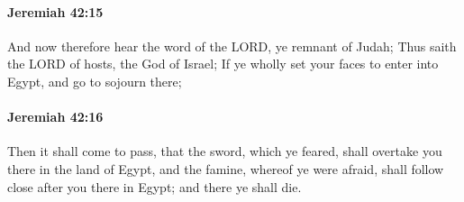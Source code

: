 		\paragraph{Jeremiah 42:15} %
			\label{JEREMIAH-42-15}

			And now therefore hear the word of the LORD, ye remnant of Judah; Thus saith the LORD of hosts, the God of Israel; If ye wholly set your faces to enter into Egypt, and go to sojourn there;


		\paragraph{Jeremiah 42:16} %
			\label{JEREMIAH-42-16}

			Then it shall come to pass, that the sword, which ye feared, shall overtake you there in the land of Egypt, and the famine, whereof ye were afraid, shall follow close after you there in Egypt; and there ye shall die.

